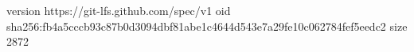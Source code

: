 version https://git-lfs.github.com/spec/v1
oid sha256:fb4a5cccb93c87b0d3094dbf81abe1c4644d543e7a29fe10c062784fef5eedc2
size 2872
